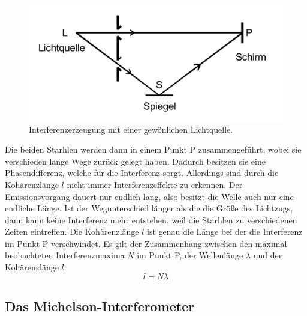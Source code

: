 \begin{figure}
    \centering
    \includegraphics{data/abb1.png}
    \caption{Interferenzerzeugung mit einer gewönlichen Lichtquelle.}
    \label{fig:abb1}
\end{figure}
\FloatBarrier
Die beiden Starhlen werden dann in einem Punkt P zusammengeführt, wobei sie verschieden lange Wege zurück gelegt haben.
Dadurch besitzen sie eine Phasendifferenz, welche für die Interferenz sorgt.
Allerdings sind durch die Kohärenzlänge $l$ nicht immer Interferenzeffekte zu erkennen.
Der Emissionsvorgang dauert nur endlich lang, also besitzt die Welle auch nur eine endliche Länge.
Ist der Wegunterschied länger als die die Größe des Lichtzugs, dann kann keine Interferenz mehr entstehen, weil die Starhlen zu verschiedenen Zeiten eintreffen.
Die Kohärenzlänge $l$ ist genau die Länge bei der die Interferenz im Punkt P verschwindet.
Es gilt der Zusammenhang zwischen den maximal beobachteten Interferenzmaxima $N$ im Punkt P, der Wellenlänge $\lambda$ und der Kohärenzlänge $l$:
\begin{equation}
    l = N \lambda
\end{equation}

\subsection{Das Michelson-Interferometer}
\label{sec:theo2}


